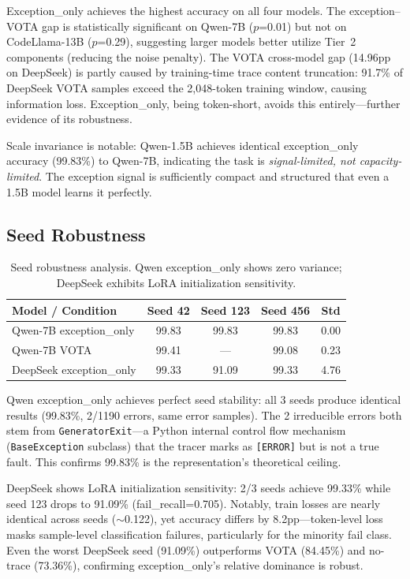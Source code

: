 \documentclass[11pt]{article}
\begin{document}
Exception\_only achieves the highest accuracy on all four models. The exception--VOTA gap is statistically significant on Qwen-7B ($p$=0.01) but not on CodeLlama-13B ($p$=0.29), suggesting larger models better utilize Tier~2 components (reducing the noise penalty). The VOTA cross-model gap (14.96pp on DeepSeek) is partly caused by training-time trace content truncation: 91.7\% of DeepSeek VOTA samples exceed the 2,048-token training window, causing information loss. Exception\_only, being token-short, avoids this entirely---further evidence of its robustness.

Scale invariance is notable: Qwen-1.5B achieves identical exception\_only accuracy (99.83\%) to Qwen-7B, indicating the task is \emph{signal-limited, not capacity-limited}. The exception signal is sufficiently compact and structured that even a 1.5B model learns it perfectly.

\subsection{Seed Robustness}

\begin{table}[h]
\centering
\caption{Seed robustness analysis. Qwen exception\_only shows zero variance; DeepSeek exhibits LoRA initialization sensitivity.}
\label{tab:seeds}
\small
\begin{tabular}{lcccc}
\toprule
\textbf{Model / Condition} & \textbf{Seed 42} & \textbf{Seed 123} & \textbf{Seed 456} & \textbf{Std} \\
\midrule
Qwen-7B exception\_only & 99.83 & 99.83 & 99.83 & 0.00 \\
Qwen-7B VOTA & 99.41 & --- & 99.08 & 0.23 \\
DeepSeek exception\_only & 99.33 & 91.09 & 99.33 & 4.76 \\
\bottomrule
\end{tabular}
\end{table}

Qwen exception\_only achieves perfect seed stability: all 3 seeds produce identical results (99.83\%, 2/1190 errors, same error samples). The 2 irreducible errors both stem from \texttt{GeneratorExit}---a Python internal control flow mechanism (\texttt{BaseException} subclass) that the tracer marks as \texttt{[ERROR]} but is not a true fault. This confirms 99.83\% is the representation's theoretical ceiling.

DeepSeek shows LoRA initialization sensitivity: 2/3 seeds achieve 99.33\% while seed 123 drops to 91.09\% (fail\_recall=0.705). Notably, train losses are nearly identical across seeds ($\sim$0.122), yet accuracy differs by 8.2pp---token-level loss masks sample-level classification failures, particularly for the minority fail class. Even the worst DeepSeek seed (91.09\%) outperforms VOTA (84.45\%) and no-trace (73.36\%), confirming exception\_only's relative dominance is robust.
\end{document}
